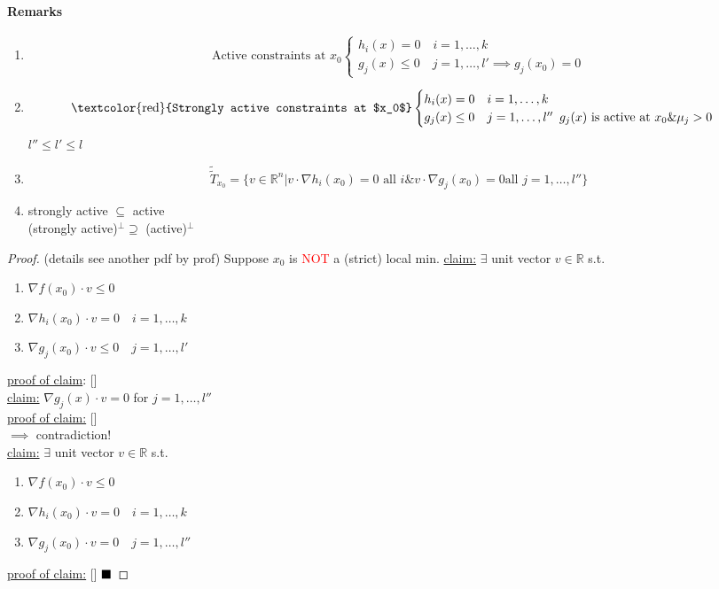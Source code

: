 \documentclass[11pt]{article}
\newcommand{\real}[0]{\mathbb{R}}
\newcommand{\under}[1]{\underline{#1}}
\newcommand{\qed}[0]{$\hfill\blacksquare$}
\begin{document}
\paragraph{Remarks}
\begin{enumerate}
	\item $$\text{Active constraints at $x_0$} \begin{cases}
	h_i(x) = 0 \quad i=1,\hdots,k \\
	g_j(x) \leq 0 \quad j = 1,\hdots, l' \implies g_j(x_0) = 0
	\end{cases}$$

	\item $$\text{\textcolor{red}{Strongly active constraints at $x_0$}} 
	\begin{cases}
	h_i(x) = 0 \quad i=1,\hdots,k \\
	g_j(x) \leq 0 \quad j = 1,\hdots, l'' \,\,\, \text{$g_j(x)$ is active at $x_0 \& \mu_j > 0$}
	\end{cases}$$
	$l'' \leq l' \leq l$
	\item $$\tilde{\tilde{T}}_{x_0} = \{ v\in \real^n | v\cdot \nabla h_i(x_0) = 0 \text{ all $i$} \& v \cdot \nabla g_j(x_0) = 0 \text{all $j = 1, \hdots, l''$} \}$$
	\item strongly active $\subseteq$ active \\
	      (strongly active)$^\perp \supseteq$ (active)$^\perp$
\end{enumerate}
\begin{proof}
	(details see another pdf by prof)
	Suppose $x_0$ is \textcolor{red}{NOT} a (strict) local min.
	\under{claim:} $\exists$ unit vector $v \in \real$ s.t.
	\begin{enumerate}
		\item $\nabla f(x_0) \cdot v \leq 0$
		\item $\nabla h_i(x_0) \cdot v = 0 \quad i = 1, \hdots, k$
		\item $\nabla g_j(x_0) \cdot v \leq 0 \quad j = 1, \hdots, l'$
	\end{enumerate}
	\under{proof of claim}: [] \\
	\under{claim:} $\nabla g_j(x)\cdot v = 0$ for $j = 1, \hdots, l''$ \\
	\under{proof of claim:} [] \\
	$\implies$ contradiction! \\
	\under{claim:} $\exists$ unit vector $v \in \real$ s.t.
	\begin{enumerate}
		\item $\nabla f(x_0) \cdot v \leq 0$
		\item $\nabla h_i(x_0) \cdot v = 0 \quad i = 1, \hdots, k$
		\item $\nabla g_j(x_0) \cdot v = 0 \quad j = 1, \hdots, l''$
	\end{enumerate}
	\under{proof of claim:} [] 
	\qed
\end{proof}
\end{document}
